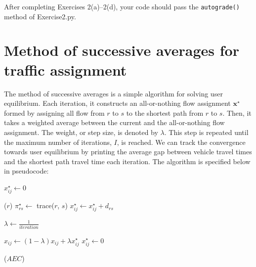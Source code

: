 \documentclass[11pt]{article}
\newcommand{\A}{\mathcal{A}}
\newcommand{\Z}{\mathcal{Z}}
\begin{document}
 \vspace{\baselineskip}
 
\noindent
After completing Exercises 2(a)--2(d), your code should pass the \texttt{autograde()} method of Exercise2.py. 


\section{Method of successive averages for traffic assignment}


The method of successive averages is a simple algorithm for solving user equilibrium. Each iteration, it constructs an all-or-nothing flow assignment $\mathbf{x}^\star$ formed by assigning all flow from $r$ to $s$ to the shortest path from $r$ to $s$. Then, it takes a weighted average between the current and the all-or-nothing flow assignment. The weight, or step size, is denoted by $\lambda$. 
This step is repeated until the maximum number of iterations, $I$, is reached. We can track the convergence towards user equilibrium by printing the average gap between vehicle travel times and the shortest path travel time each iteration.
The algorithm is specified below in pseudocode:

\vspace{\baselineskip}

\begin{algorithmic}[1]
	\For{$(i,j)\in\A$} 
	\State $x^\star_{ij} \leftarrow 0$
	\EndFor
	
	\vspace{0.5\baselineskip}
	
	 \label{msa5}
	\For{$r\in\Z$}  \label{msa6}
	($r$) 
	\For{$s\in\Z$}
	\State $\pi^\star_{rs} \leftarrow$ {\sc trace($r$, $s$)}
	 
	\State $x^\star_{ij} \leftarrow x^\star_{ij} + d_{rs}$ \label{msa11}
	\EndFor
	\EndFor
	\EndFor \label{msa14}
	
	\vspace{0.5\baselineskip}
	
	
	\State $\lambda \leftarrow \frac{1}{iteration}$  \label{msa15}
	
	\vspace{0.5\baselineskip}
	
	\For{$(i,j)\in\A$}  \label{msa16}
	\State $x_{ij} \leftarrow (1-\lambda)x_{ij} + \lambda x^\star_{ij}$ \label{msa17}
	\State $x^\star_{ij}\leftarrow 0$ \label{msa18}
	\EndFor
	
	\vspace{0.5\baselineskip}
	
	($AEC$) 
	
	\EndFor
	\EndProcedure
\end{algorithmic}
\end{document}
